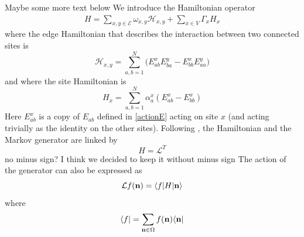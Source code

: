 \documentclass[10pt]{article}
\numberwithin{equation}{section}
\numberwithin{equation}{subsection}
\begin{document}
{\color{red}Maybe some more text below}
We introduce the Hamiltonian operator
\begin{equation}\label{OriginalHamiltonian}
	\begin{split}
		H=\sum_{x,y\in \mathcal{E}}\omega_{x,y}\mathcal{H}_{x,y}+\sum_{x\in V}\Gamma_{x}H_{x}
	\end{split}
\end{equation}
where the edge Hamiltonian that describes the interaction between two connected sites is
\begin{equation}\label{edgeHamiltonian}
\mathcal{H}_{x,y}=\sum_{a,b=1}^{N}\Big(E_{ab}^{x} E_{b a}^{y}-E_{bb}^{x} E_{aa}^{y}\Big)
 \end{equation}
  and where the site Hamiltonian is
 \begin{equation}\label{siteHamiltonian}
H_{x}=\sum_{a,b=1}^{N}\alpha_{a}^{x}\left(E_{ab}^{x}-E_{bb}^{x}\right)
\end{equation}
Here $E_{ab}^{x}$ is a copy of $E_{ab}$ defined in \eqref{actionE} acting on site $x$ (and
acting trivially as the identity on the other sites). 
Following  \cite{belitsky2015self}, the Hamiltonian and the Markov generator are linked by
\begin{equation}\label{Hamiltonian-Generator}
H=\mathcal{L}^{T}
\end{equation}
{\color{red} no minus sign?} {\color{blue}I think we decided to keep it without minus sign}
The action of the generator can also be expressed as 
\begin{equation}
    \mathcal{L}f( {\bf n})=\langle f|H| {\bf n}\rangle
\end{equation}
where 
\begin{equation}
    \langle f|=\sum_{ {{\bf n}\in \Omega}}f( {\bf n})\langle  {\bf n}|
\end{equation}
\end{document}
